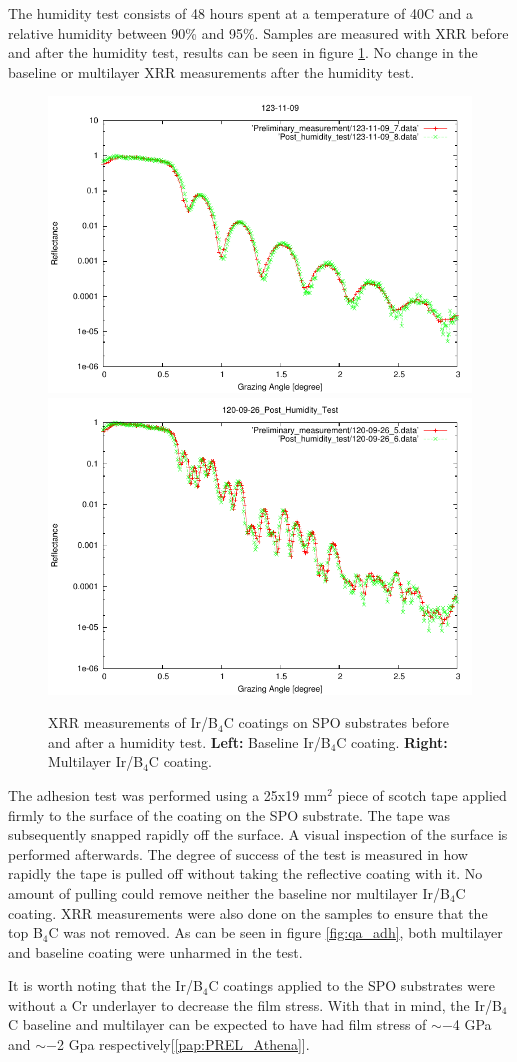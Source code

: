 The humidity test consists of 48 hours spent at a temperature of 40\degr C and a relative humidity between 90\% and 95\%. Samples are measured with XRR before and after the humidity test, results can be seen in figure \ref{fig:qa_hum}. No change in the baseline or multilayer XRR measurements after the humidity test.

\begin{figure}[!h]
  \center  \includegraphics[width=0.47\linewidth]{figures/athena/coating_on_spo/123-11-09_Post_Humidity_test.pdf}
  \includegraphics[width=0.47\linewidth]{figures/athena/coating_on_spo/120-09-26_Post_Humidity_Test.pdf}
\caption{\footnotesize XRR measurements of Ir/B$_4$C coatings on SPO substrates before and after a humidity test. \textbf{Left:} Baseline Ir/B$_4$C coating. \textbf{Right:} Multilayer Ir/B$_4$C coating.}\label{fig:qa_hum}
\end{figure}

The adhesion test was performed using a 25x19 mm$^2$ piece of scotch tape applied firmly to the surface of the coating on the SPO substrate. The tape was subsequently snapped rapidly off the surface. A visual inspection of the surface is performed afterwards. The degree of success of the test is measured in how rapidly the tape is pulled off without taking the reflective coating with it. No amount of pulling could remove neither the baseline nor multilayer Ir/B$_4$C coating. XRR measurements were also done on the samples to ensure that the top B$_4$C was not removed. As can be seen in figure \ref{fig:qa_adh}, both multilayer and baseline coating were unharmed in the test.

It is worth noting that the Ir/B$_4$C coatings applied to the SPO substrates were without a Cr underlayer to decrease the film stress. With that in mind, the Ir/B$_4$C baseline and multilayer can be expected to have had film stress of $\sim-$4 GPa and $\sim-$2 Gpa respectively[\ref{pap:PREL_Athena}].

